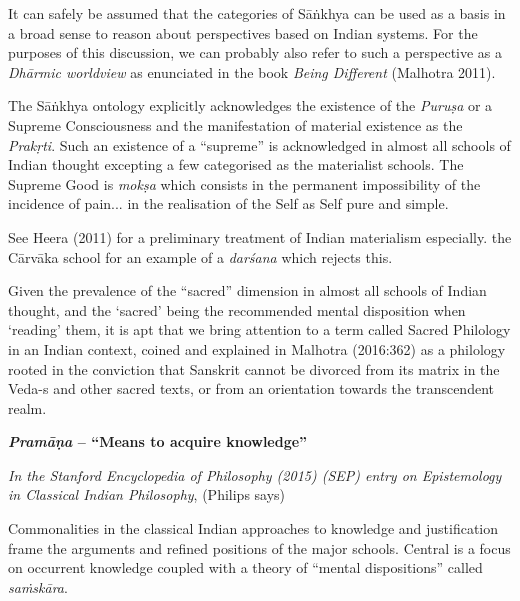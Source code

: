 It can safely be assumed that the categories of Sāṅkhya can be used as a basis in a broad sense to reason about perspectives based on Indian systems. For the purposes of this discussion, we can probably also refer to such a perspective as a {\sl Dhārmic worldview} as enunciated in the book {\sl Being Different} (Malhotra 2011).

The Sāṅkhya ontology explicitly acknowledges the existence of the {\sl Puruṣa} or a Supreme Consciousness and the manifestation of material existence as the {\sl Prakṛti}. Such an existence of a ``supreme'' is acknowledged in almost all schools of Indian thought excepting a few categorised as the materialist schools. The Supreme Good is {{\sl mokṣa}\relax} which consists in the permanent impossibility of the incidence of pain... in the realisation of the Self as Self pure and simple.

See Heera (2011) for a preliminary treatment of Indian materialism especially. the Cārvāka school for an example of a {\sl darśana} which rejects this.

Given the prevalence of the ``sacred'' dimension in almost all schools of Indian thought, and the `sacred' being the recommended mental disposition when `reading' them, it is apt that  we bring attention to a term called Sacred Philology in an Indian context, coined and explained in Malhotra  (2016:362) as a philology rooted in the conviction that Sanskrit cannot be divorced from its matrix in the Veda-s and other sacred texts, or from an orientation towards the transcendent realm.

\newpage

{\bf {\sl\bfseries Pramāṇa}  -- ``Means to acquire knowledge''}

{\sl In the Stanford Encyclopedia of Philosophy (2015) (SEP) entry on Epistemology in Classical Indian Philosophy}, (Philips says)
\begin{myquote}
Commonalities in the classical Indian approaches to knowledge and justification frame the arguments and refined positions of the major schools. Central is a focus on occurrent knowledge coupled with a theory of ``mental dispositions'' called {\sl saṁskāra}.
\end{myquote}

